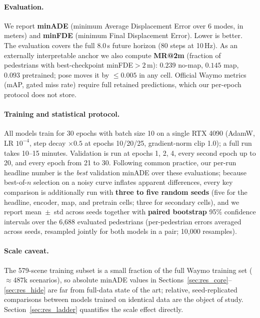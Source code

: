 \documentclass{article} %
\newcommand{\minADE}{minADE\xspace}
\newcommand{\minFDE}{minFDE\xspace}
\begin{document}
\paragraph{Evaluation.}
We report \textbf{\minADE} (minimum Average Displacement Error over 6 modes, in meters)
and \textbf{\minFDE} (minimum Final Displacement Error). Lower is better.
The evaluation covers the full 8.0\,s future horizon (80 steps at 10\,Hz).
As an externally interpretable anchor we also compute \textbf{MR@2m} (fraction of
pedestrians with best-checkpoint \minFDE $>2$\,m): $0.239$ no-map, $0.145$ map,
$0.093$ pretrained; pose moves it by $\leq 0.005$ in any cell. Official Waymo
metrics (mAP, gated miss rate) require full retained predictions, which our
per-epoch protocol does not store.

\paragraph{Training and statistical protocol.}
All models train for 30 epochs with batch size 10 on a single RTX 4090
(AdamW, LR $10^{-4}$, step decay $\times 0.5$ at epochs 10/20/25, gradient-norm
clip 1.0); a full run takes 10--15 minutes. Validation is run at epochs
1, 2, 4, every second epoch up to 20, and every epoch from 21 to 30.
Following common practice, our per-run headline number is the \emph{best}
validation \minADE over these evaluations; because best-of-$n$ selection on a
noisy curve inflates apparent differences, every key comparison is additionally
run with \textbf{three to five random seeds} (five for the headline, encoder, map,
and pretrain cells; three for secondary cells), and we report
mean~$\pm$~std across seeds
together with \textbf{paired bootstrap} 95\% confidence intervals over the
6{,}688 evaluated pedestrians (per-pedestrian errors averaged across seeds,
resampled jointly for both models in a pair; 10{,}000 resamples).

\paragraph{Scale caveat.}
The 579-scene training subset is a small fraction of the full Waymo training set
(${\approx}487$k scenarios), so absolute \minADE values in
Sections~\ref{sec:res_core}--\ref{sec:res_hide} are far from
full-data state of the art; relative, seed-replicated comparisons between models
trained on identical data are the object of study.
Section~\ref{sec:res_ladder} quantifies the scale effect directly.
\end{document}
